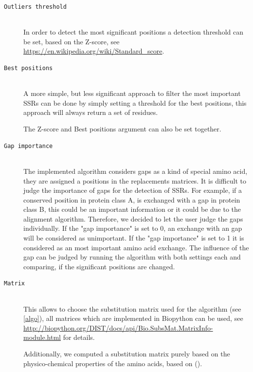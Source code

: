 \documentclass[a4paper,10pt]{article}
\begin{document}
\begin{description}

\item[\texttt{Outliers threshold}] \hfill \\

In order to detect the most significant positions a detection threshold can be set, based on the Z-score,
see \url{https://en.wikipedia.org/wiki/Standard_score}. 
 
\item[\texttt{Best positions}] \hfill \\

A more simple, but less significant approach to filter the most important SSRs can be done by simply setting a 
threshold for the best positions, this approach will always return a set of residues. 

The Z-score and Best positions argument can also be set together.

\item[\texttt{Gap importance}] \hfill \\

The implemented algorithm considers gaps as a kind of special amino acid, they are assigned a positions in the replacements matrices.
It is difficult to judge the importance of gaps for the detection of SSRs. For example, if a conserved position in protein class A, is 
exchanged with a gap in protein class B, this could be an important information or it could be due to the alignment algorithm.
Therefore, we decided to let the user judge the gaps individually. If the "gap importance" is set to 0, an exchange with an gap will be considered as
unimportant. If the "gap importance" is set to 1 it is considered as an most important amino acid exchange. The influence of the gap can be judged
by running the algorithm with both settings each and comparing, if the significant positions are changed.

\item[\texttt{Matrix}] \hfill \\

This allows to choose the substitution matrix used for the algorithm (see \ref{algo}), all matrices which are implemented in Biopython can be used,
see \url{http://biopython.org/DIST/docs/api/Bio.SubsMat.MatrixInfo-module.html} for details. 

Additionally, we computed a substitution matrix purely based on the physico-chemical properties of the amino acids, based on (). 


\end{description}
\end{document}
